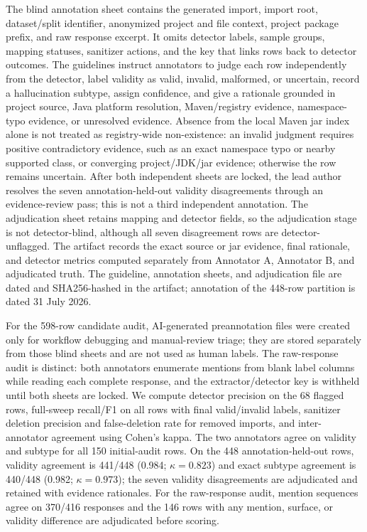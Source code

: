 \documentclass[pdflatex,sn-basic]{sn-jnl}
\begin{document}
The blind annotation sheet contains the generated import, import root, dataset/split identifier, anonymized project and file context, project package prefix, and raw response excerpt. It omits detector labels, sample groups, mapping statuses, sanitizer actions, and the key that links rows back to detector outcomes. The guidelines instruct annotators to judge each row independently from the detector, label validity as valid, invalid, malformed, or uncertain, record a hallucination subtype, assign confidence, and give a rationale grounded in project source, Java platform resolution, Maven/registry evidence, namespace-typo evidence, or unresolved evidence. Absence from the local Maven jar index alone is not treated as registry-wide non-existence: an invalid judgment requires positive contradictory evidence, such as an exact namespace typo or nearby supported class, or converging project/JDK/jar evidence; otherwise the row remains uncertain. After both independent sheets are locked, the lead author resolves the seven annotation-held-out validity disagreements through an evidence-review pass; this is not a third independent annotation. The adjudication sheet retains mapping and detector fields, so the adjudication stage is not detector-blind, although all seven disagreement rows are detector-unflagged. The artifact records the exact source or jar evidence, final rationale, and detector metrics computed separately from Annotator A, Annotator B, and adjudicated truth. The guideline, annotation sheets, and adjudication file are dated and SHA256-hashed in the artifact; annotation of the 448-row partition is dated 31 July 2026.

For the 598-row candidate audit, AI-generated preannotation files were created only for workflow debugging and manual-review triage; they are stored separately from those blind sheets and are not used as human labels. The raw-response audit is distinct: both annotators enumerate mentions from blank label columns while reading each complete response, and the extractor/detector key is withheld until both sheets are locked. We compute detector precision on the 68 flagged rows, full-sweep recall/F1 on all rows with final valid/invalid labels, sanitizer deletion precision and false-deletion rate for removed imports, and inter-annotator agreement using Cohen's kappa. The two annotators agree on validity and subtype for all 150 initial-audit rows. On the 448 annotation-held-out rows, validity agreement is 441/448 (0.984; $\kappa=0.823$) and exact subtype agreement is 440/448 (0.982; $\kappa=0.973$); the seven validity disagreements are adjudicated and retained with evidence rationales. For the raw-response audit, mention sequences agree on 370/416 responses and the 146 rows with any mention, surface, or validity difference are adjudicated before scoring.
\end{document}
